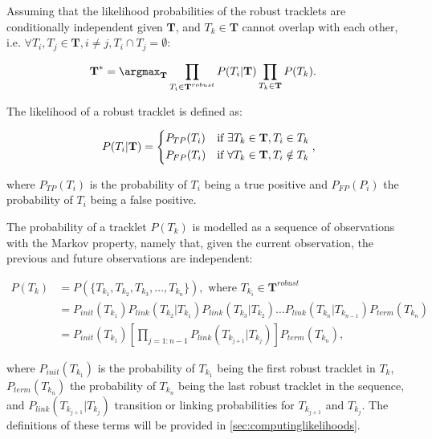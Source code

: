 		Assuming that the likelihood probabilities of the robust tracklets are conditionally independent given $\textbf{T}$, and $ T_k \in \textbf{T}$  cannot overlap with each other, i.e. $ \forall T_i, T_j \in \textbf{T}, i \neq j,  T_i \cap T_j = \emptyset $:
				
		\begin{align*}
			\textbf{T}^* &= \argmax_{\textbf{T}}   \prod_{T_i \in \textbf{T}^{robust}} P(T_i | \textbf{T}) \prod_{T_k \in \textbf{T}} P(T_k) \text{.}
		\end{align*}
		
		The likelihood of a robust tracklet is defined as:
		
		\[
			P(T_i | \textbf{T}) = \begin{dcases}
						   P_{TP}(T_i) & \text{if } \exists T_k \in \textbf{T}, T_i \in T_k \\
						   P_{FP}(T_i) & \text{if } \forall T_k \in \textbf{T}, T_i \notin T_k
						\end{dcases} \text{,}
		\]
  	 	
  	 	\noindent where $ P_{TP}(T_i) $ is the probability of $T_i$ being a true positive and $P_{FP}(P_i) $ the probability of $T_i$ being a false positive.
  	 	
  	 	The probability of a tracklet $P(T_k)$ is modelled as a sequence of observations with the Markov property, namely that, given the current observation, the previous and future observations are independent:
  	 	
  	 	\begin{align*}
  	 		P(T_k) &= P(\{T_{k_1}, T_{k_2}, T_{k_3}, \dots, T_{k_n}\}), \text{ where } T_{k_i} \in \textbf{T}^{robust} \\
  	 			&= P_{init}(T_{k_1}) P_{link}(T_{k_2}|T_{k_1}) P_{link}(T_{k_3}|T_{k_2}) \dots P_{link}(T_{k_n}|T_{k_{n-1}}) P_{term}(T_{k_n}) \\
  	 			&= P_{init}(T_{k_1}) \left[ \prod_{j=1:{n-1}} P_{link}(T_{k_{j+1}}|T_{k_j}) \right] P_{term}(T_{k_n}) \text{,}
  	 	\end{align*}
  	 	
  	 	\noindent where $P_{init}(T_{k_1})$ is the probability of $T_{k_1}$ being the first robust tracklet in $T_k$, $P_{term}(T_{k_n})$ the probability of $T_{k_n}$ being the last robust tracklet in the sequence, and $P_{link}(T_{k_{j+1}}|T_{k_j})$ transition or linking probabilities for $T_{k_{j+1}}$ and $T_{k_{j}}$. The definitions of these terms will be provided in \cref{sec:computinglikelihoods}.
  	 	
